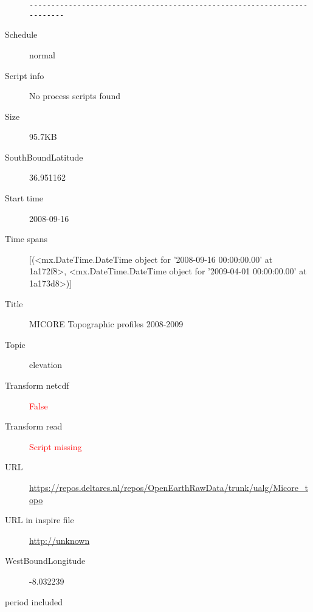 \documentclass[9]{report}
\begin{document}
\begin{description}
\begin{verbatim}
------------------------------------------------------------------------

\end{verbatim}
  \item[Schedule] normal
  \item[Script info] No process scripts found
  \item[Size] 95.7KB
  \item[SouthBoundLatitude] 36.951162
  \item[Start time] 2008-09-16
  \item[Time spans] [(<mx.DateTime.DateTime object for '2008-09-16 00:00:00.00' at 1a172f8>, <mx.DateTime.DateTime object for '2009-04-01 00:00:00.00' at 1a173d8>)]
  \item[Title]  MICORE Topographic profiles 2008-2009 
  \item[Topic] elevation
  \item[Transform netcdf] \textcolor{red}{False}
  \item[Transform read] \textcolor{red}{Script missing}
  \item[URL] \href{https://repos.deltares.nl/repos/OpenEarthRawData/trunk/ualg/Micore\_topo}{https://repos.deltares.nl/repos/OpenEarthRawData/trunk/ualg/Micore\_topo}
  \item[URL in inspire file] \href{http://unknown}{http://unknown}
  \item[WestBoundLongitude] -8.032239
  \item[period included] 
\end{description}
\end{document}
